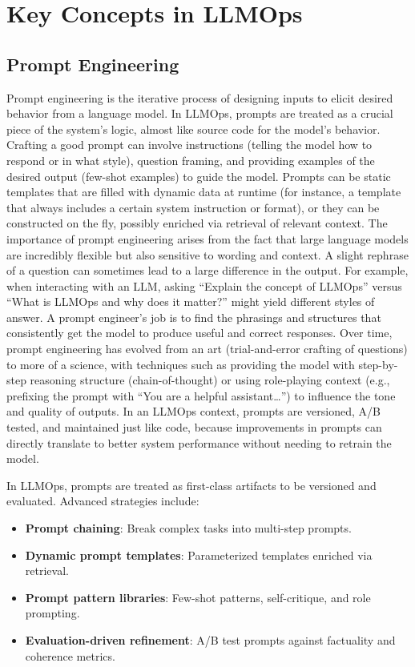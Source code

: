 \section{Key Concepts in LLMOps}
\label{sec:ch2-key-concepts}
\subsection{Prompt Engineering}
Prompt engineering is the iterative process of designing inputs to elicit desired behavior from a language model. In LLMOps, prompts are treated as a crucial piece of the system’s logic, almost like source code for the model’s behavior. Crafting a good prompt can involve instructions (telling the model how to respond or in what style), question framing, and providing examples of the desired output (few-shot examples) to guide the model. Prompts can be static templates that are filled with dynamic data at runtime (for instance, a template that always includes a certain system instruction or format), or they can be constructed on the fly, possibly enriched via retrieval of relevant context. The importance of prompt engineering arises from the fact that large language models are incredibly flexible but also sensitive to wording and context. A slight rephrase of a question can sometimes lead to a large difference in the output. For example, when interacting with an LLM, asking “Explain the concept of LLMOps” versus “What is LLMOps and why does it matter?” might yield different styles of answer. A prompt engineer’s job is to find the phrasings and structures that consistently get the model to produce useful and correct responses. Over time, prompt engineering has evolved from an art (trial-and-error crafting of questions) to more of a science, with techniques such as providing the model with step-by-step reasoning structure (chain-of-thought) or using role-playing context (e.g., prefixing the prompt with “You are a helpful assistant…”) to influence the tone and quality of outputs. In an LLMOps context, prompts are versioned, A/B tested, and maintained just like code, because improvements in prompts can directly translate to better system performance without needing to retrain the model.



In LLMOps, prompts are treated as first-class artifacts to be versioned and evaluated. Advanced strategies include:
\begin{itemize}
    \item \textbf{Prompt chaining}: Break complex tasks into multi-step prompts.
    \item \textbf{Dynamic prompt templates}: Parameterized templates enriched via retrieval.
    \item \textbf{Prompt pattern libraries}: Few-shot patterns, self-critique, and role prompting.
    \item \textbf{Evaluation-driven refinement}: A/B test prompts against factuality and coherence metrics.
\end{itemize}

